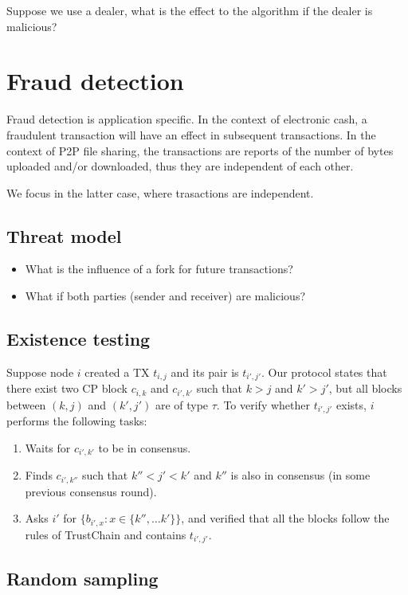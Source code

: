 Suppose we use a dealer, what is the effect to the algorithm if the dealer is
malicious?

\section{Fraud detection}
Fraud detection is application specific. In the context of electronic cash, a
fraudulent transaction will have an effect in subsequent transactions. In the
context of P2P file sharing, the transactions are reports of the number of bytes
uploaded and/or downloaded, thus they are independent of each other.

We focus in the latter case, where trasactions are independent.

\subsection{Threat model}
\begin{itemize}
\item What is the influence of a fork for future transactions?
\item What if both parties (sender and receiver) are malicious?
\end{itemize}

\subsection{Existence testing}
Suppose node $i$ created a TX $t_{i,j}$ and its pair is $t_{i',j'}$. Our
protocol states that there exist two CP block $c_{i,k}$ and $c_{i',k'}$ such
that $k>j$ and $k' > j'$, but all blocks between $(k, j)$ and $(k', j')$ are of
type $\tau$. To verify whether $t_{i', j'}$ exists, $i$ performs the following
tasks:
\begin{enumerate}
\item Waits for $c_{i', k'}$ to be in consensus.
\item Finds $c_{i', k''}$ such that $k'' < j' < k'$ and $k''$ is also in
  consensus (in some previous consensus round).
\item Asks $i'$ for $\{b_{i', x} : x \in \{ k'', \dots k' \}\}$, and verified
  that all the blocks follow the rules of TrustChain and contains $t_{i', j'}$.
\end{enumerate}


\subsection{Random sampling}

